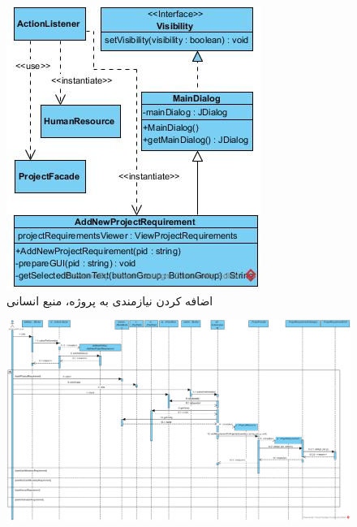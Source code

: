 \begin{landscape}
\begin{figure}[H]
	\includegraphics[scale=0.5]{img/sequence-design/AddRequirementToProject_HUMANUI}
	\caption{اضافه کردن نیازمندی به پروژه، منبع انسانی}
\end{figure}
\begin{figure}[H]
	\centering
	\includegraphics[scale=0.5]{img/sequence-design/AddRequirementToProject_PHYSICAL}
\end{figure}
\begin{figure}[H]
	\centering

\end{figure}
\end{landscape}
